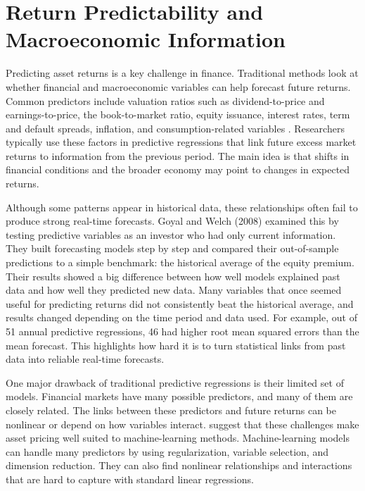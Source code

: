 \documentclass[12pt,a4paper,twoside,openany]{book}
\begin{document}
\section{Return Predictability and Macroeconomic Information}
\label{return-predictability-and-macroeconomic-information}

Predicting asset returns is a key challenge in finance. 
Traditional methods look at whether financial and macroeconomic variables 
can help forecast future returns. Common predictors include valuation ratios 
such as dividend-to-price and earnings-to-price, the book-to-market ratio, 
equity issuance, interest rates, term and default spreads, inflation, and 
consumption-related variables \cite{welch2008equity}. Researchers typically 
use these factors in predictive regressions that link future excess market returns to information from the previous period. The main idea is that shifts in financial conditions and the broader economy may point to changes in expected returns.

Although some patterns appear in historical data, these relationships often fail to produce strong real-time forecasts. Goyal and Welch (2008) examined this by testing predictive variables as an investor who had only current information. They built forecasting models step by step and compared their out-of-sample predictions to a simple benchmark: the historical average of the equity premium. Their results showed a big difference between how well models explained past data and how well they predicted new data. Many variables that once seemed useful for predicting returns did not consistently beat the historical average, and results changed depending on the time period and data used. For example, out of 51 annual predictive regressions, 46 had higher root mean squared errors than the mean forecast. This highlights how hard it is to turn statistical links from past data into reliable real-time forecasts.

One major drawback of traditional predictive regressions is their limited set of models. Financial markets have many possible predictors, and many of them are closely related. The links between these predictors and future returns can be nonlinear or depend on how variables interact. \cite{gu2020empirical} suggest that these challenges make asset pricing well suited to machine-learning methods. Machine-learning models can handle many predictors by using regularization, variable selection, and dimension reduction. They can also find nonlinear relationships and interactions that are hard to capture with standard linear regressions.
\end{document}
